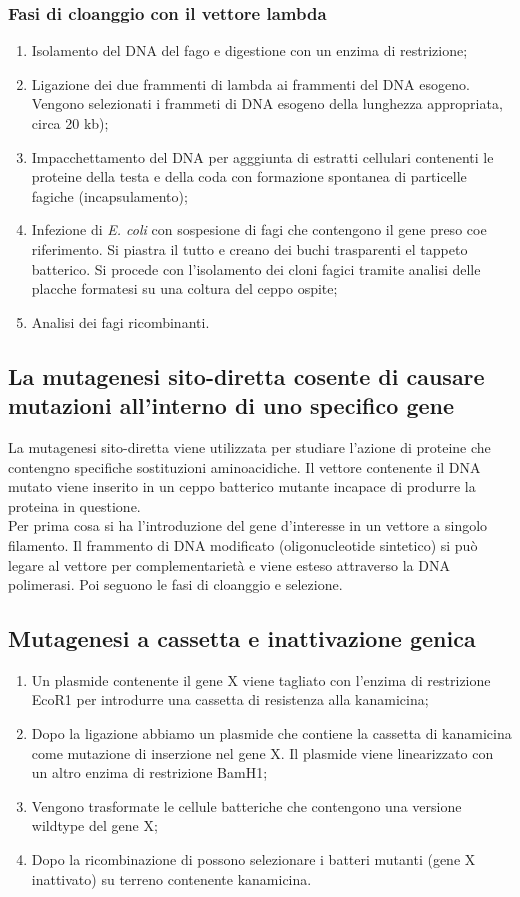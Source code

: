 \subsubsection{Fasi di cloanggio con il vettore lambda}
\begin{enumerate}
    \item Isolamento del DNA del fago e digestione con un enzima di restrizione; 
    \item Ligazione dei due frammenti di lambda ai frammenti del DNA esogeno. Vengono selezionati i frammeti di DNA esogeno della lunghezza appropriata, circa 20 kb); 
    \item Impacchettamento del DNA per agggiunta di estratti cellulari contenenti le proteine della testa e della coda con formazione spontanea di particelle fagiche (incapsulamento); 
    \item Infezione di \textit{E. coli} con sospesione di fagi che contengono il gene preso coe riferimento. Si piastra il tutto e creano dei buchi trasparenti el tappeto batterico. Si procede con l'isolamento dei cloni fagici tramite analisi delle placche formatesi su una coltura del ceppo ospite; 
    \item Analisi dei fagi ricombinanti. 
\end{enumerate}
\subsection{La mutagenesi sito-diretta cosente di causare mutazioni all'interno di uno specifico gene}
La mutagenesi sito-diretta viene utilizzata per studiare l'azione di proteine che contengno specifiche sostituzioni aminoacidiche. Il vettore contenente il DNA mutato viene inserito in un ceppo batterico mutante incapace di produrre la proteina in questione. 
\\Per prima cosa si ha l'introduzione del gene d'interesse in un vettore a singolo filamento. Il frammento di DNA modificato (oligonucleotide sintetico) si può legare al vettore per complementarietà e viene esteso attraverso la DNA polimerasi. Poi seguono le fasi di cloanggio e selezione. 
\subsection{Mutagenesi a cassetta e inattivazione genica}
\begin{enumerate}
    \item Un plasmide contenente il gene X viene tagliato con l'enzima di restrizione EcoR1 per introdurre una cassetta di resistenza alla kanamicina; 
    \item Dopo la ligazione abbiamo un plasmide che contiene la cassetta di kanamicina come mutazione di inserzione nel gene X. Il plasmide viene linearizzato con un altro enzima di restrizione BamH1; 
    \item Vengono trasformate le cellule batteriche che contengono una versione wildtype del gene X; 
    \item Dopo la ricombinazione di possono selezionare i batteri mutanti (gene X inattivato) su terreno contenente kanamicina.
\end{enumerate}
